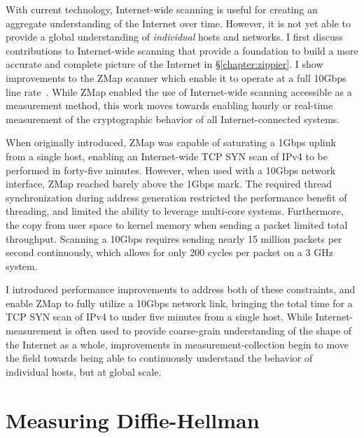 With current technology, Internet-wide scanning is useful for creating an
aggregate understanding of the Internet over time. However, it is not yet
able to provide a global understanding of \textit{individual} hosts and
networks. I first discuss contributions to Internet-wide scanning that
provide a foundation to build a more accurate and complete picture of the
Internet in \S\ref{chapter:zippier}. I show improvements to the ZMap scanner
which enable it to operate at a full 10Gbps line
rate~\cite{zippier-zmap-2014}. While ZMap enabled the use of Internet-wide
scanning accessible as a measurement method, this work moves towards enabling
hourly or real-time measurement of the cryptographic behavior of all
Internet-connected systems.

When originally introduced, ZMap was capable of saturating a 1Gbps uplink from
a single host, enabling an Internet-wide TCP SYN scan of IPv4 to be performed
in forty-five minutes. However, when used with a 10Gbps network interface, ZMap
reached barely above the 1Gbps mark. The required thread synchronization during
address generation restricted the performance benefit of threading, and limited
the ability to leverage multi-core systems. Furthermore, the copy from user
space to kernel memory when sending a packet limited total throughput. Scanning
a 10Gbps requires sending nearly 15 million packets per second continuously,
which allows for only 200 cycles per packet on a 3 GHz system.

I introduced performance improvements to address both of these constraints, and
enable ZMap to fully utilize a 10Gbps network link, bringing the total time for
a TCP SYN scan of IPv4 to under five minutes from a single host. While
Internet-measurement is often used to provide coarse-grain understanding of the
shape of the Internet as a whole, improvements in measurement-collection begin
to move the field towards being able to continuously understand the behavior of
individual hosts, but at global scale.

\section{Measuring Diffie-Hellman}

